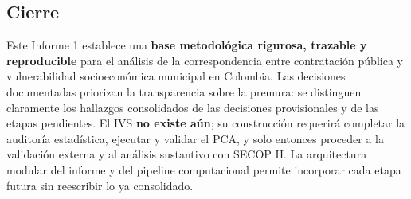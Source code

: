 \subsection{Cierre}

Este Informe 1 establece una \textbf{base metodológica rigurosa, trazable y reproducible} para el análisis de la correspondencia entre contratación pública y vulnerabilidad socioeconómica municipal en Colombia. Las decisiones documentadas priorizan la transparencia sobre la premura: se distinguen claramente los hallazgos consolidados de las decisiones provisionales y de las etapas pendientes. El IVS \textbf{no existe aún}; su construcción requerirá completar la auditoría estadística, ejecutar y validar el PCA, y solo entonces proceder a la validación externa y al análisis sustantivo con SECOP II. La arquitectura modular del informe y del pipeline computacional permite incorporar cada etapa futura sin reescribir lo ya consolidado.



